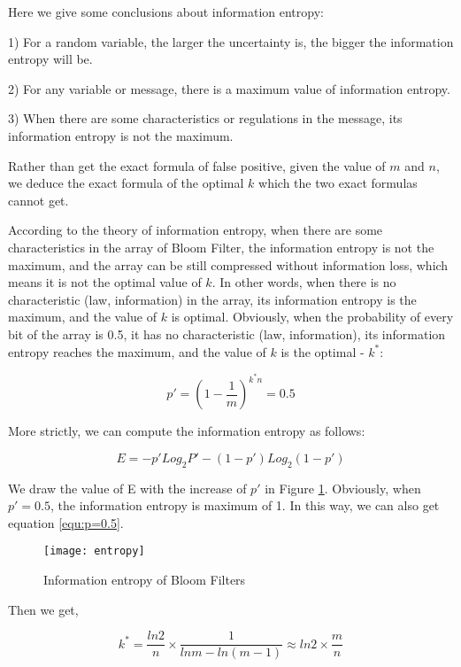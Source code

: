 Here we give some conclusions about information entropy:

1) For a random variable, the larger the uncertainty is, the bigger the information entropy will be. 

2) For any variable or message, there is a maximum value of information entropy.

3) When there are some characteristics or regulations in the message, its information entropy is not the maximum.


Rather than get the exact formula of false positive, given the value of $m$ and $n$, we deduce the exact formula of the optimal $k$ which the two exact formulas cannot get.

According to the theory of information entropy, when there are some characteristics in the array of Bloom Filter, the information entropy is not the maximum, and the array can be still compressed without information loss, which means it is not the optimal value of $k$. In other words, when there is no characteristic (law, information) in the array, its information entropy is the maximum, and the value of $k$ is optimal. Obviously, when the probability of every bit of the array is 0.5, it has no characteristic (law, information), its information entropy reaches the maximum, and the value of $k$ is the optimal - $k^*$:

\begin{equation}
p'=\left(1-\frac{1}{m}\right)^{k^* n}=0.5
\label{equ:p=0.5}
\end{equation}

More strictly, we can compute the information entropy as follows:

\begin{equation}
E=-p'Log_2P'-(1-p')Log_2(1-p')
\end{equation}

We draw the value of E with the increase of $p'$ in Figure \ref{fig:entropy}. Obviously, when $p'=0.5$, the information entropy is maximum of 1. In this way, we can also get equation \ref{equ:p=0.5}.

\begin{figure}
\centering
\texttt{[image: entropy]}
\caption{Information entropy of Bloom Filters}
\label{fig:entropy}
\end{figure} 

Then we get,

\begin{equation}
\label{kform}
k^*=\dfrac{ln2}{n} \times \dfrac{1}{lnm-ln(m-1)} \approx ln2 \times \dfrac{m}{n}
\end{equation}

